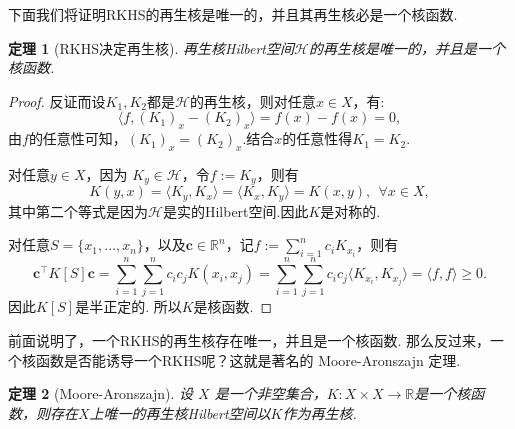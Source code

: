 \documentclass[12pt, a4paper, oneside]{ctexbook}
\newtheorem{theorem}{定理}[section]
\begin{document}
下面我们将证明RKHS的再生核是唯一的，并且其再生核必是一个核函数.
\begin{theorem}[RKHS决定再生核]
    再生核Hilbert空间$\mathcal{H}$的再生核是唯一的，并且是一个核函数.
\end{theorem}

\begin{proof}
    反证而设$K_1,K_2$都是$\mathcal{H}$的再生核，则对任意$x\in X$，有:
    \begin{equation*}
        \langle f,(K_1)_x-(K_2)_x\rangle=f(x)-f(x)=0,
    \end{equation*}
    由$f$的任意性可知，$(K_1)_x=(K_2)_x$.结合$x$的任意性得$K_1=K_2$.

    对任意$y\in X$，因为 $K_y\in\mathcal{H}$，令$f:=K_y$，则有
    \begin{equation*}
        K(y,x)=\langle K_y,K_x\rangle=\langle K_x,K_y\rangle=K(x,y),~~\forall x\in X,
    \end{equation*}
    其中第二个等式是因为$\mathcal{H}$是实的Hilbert空间.因此$K$是对称的.

    对任意$S=\{x_1,\dots,x_n\}$，以及$\boldsymbol{c}\in\mathbb{R}^n$，记$f:=\sum_{i=1}^n c_i K_{x_i}$，则有
    \begin{equation*}
        \boldsymbol{c}^\top K[S]\boldsymbol{c}=\sum_{i=1}^n\sum_{j=1}^nc_ic_jK(x_i,x_j)=\sum_{i=1}^n\sum_{j=1}^nc_ic_j\langle K_{x_i},K_{x_j}\rangle = \langle f,f\rangle\geq 0.
    \end{equation*}
    因此$K[S]$是半正定的. 所以$K$是核函数.
\end{proof}

前面说明了，一个RKHS的再生核存在唯一，并且是一个核函数. 那么反过来，一个核函数是否能诱导一个RKHS呢？这就是著名的 Moore-Aronszajn 定理.

\begin{theorem}[Moore-Aronszajn]\label{thm:Moore-Aronszajn}
    设 $X$ 是一个非空集合，$K:X\times X\to \mathbb{R}$是一个核函数，则存在$X$上唯一的再生核Hilbert空间以$K$作为再生核.
\end{theorem}
\end{document}
